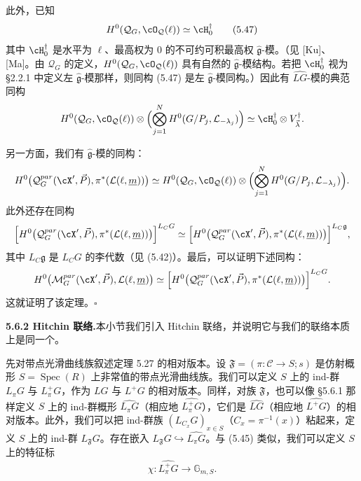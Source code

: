此外，已知
\begin{equation}
 H^0(\mathcal Q_G,\cO_{\mathcal Q}(\ell))\simeq\cH_0^\dagger \tag{5.47}
\end{equation}
其中 $\cH_0^\dagger$ 是水平为 $\ell$、最高权为 0 的不可约可积最高权 $\hat{\mathfrak g}$-模。（见 [Ku]、[Ma]。由 $\mathcal Q_G$ 的定义，$H^0(\mathcal Q_G,\cO_{\mathcal Q}(\ell))$ 具有自然的 $\hat{\mathfrak g}$-模结构。若把 $\cH_0^\dagger$ 视为 §2.2.1 中定义左 $\hat{\mathfrak g}$-模那样，则同构 (5.47) 是左 $\hat{\mathfrak g}$-模同构。）因此有 $\widehat{LG}$-模的典范同构
\[
 H^0(\mathcal Q_G,\cO_{\mathcal Q}(\ell))\otimes\Bigl(\bigotimes_{j=1}^N H^0(G/P_j,\mathcal L_{-\lambda_j})\Bigr)
 \simeq\cH_0^\dagger\otimes V_{\vec\lambda}^\dagger.
\]


另一方面，我们有 $\hat{\mathfrak g}$-模的同构：
\[
 H^0\bigl(\mathcal Q_G^{par}(\cX',\vec P),\pi^*(\mathcal L(\ell,\underline m))\bigr)
 \simeq H^0(\mathcal Q_G,\cO_{\mathcal Q}(\ell))\otimes\Bigl(\bigotimes_{j=1}^N H^0(G/P_j,\mathcal L_{-\lambda_j})\Bigr).
\]
此外还存在同构
\[
 \Bigl[H^0\bigl(\mathcal Q_G^{par}(\cX',\vec P),\pi^*(\mathcal L(\ell,\underline m))\bigr)\Bigr]^{L_CG}
 \simeq\Bigl[H^0\bigl(\mathcal Q_G^{par}(\cX',\vec P),\pi^*(\mathcal L(\ell,\underline m))\bigr)\Bigr]^{L_C\mathfrak g},
\]
其中 $L_C\mathfrak g$ 是 $L_CG$ 的李代数（见 (5.42)）。最后，可以证明下述同构：
\[
 H^0\bigl(\mathcal M_G^{par}(\cX',\vec P),\mathcal L(\ell,\underline m)\bigr)
 \simeq\Bigl[H^0\bigl(\mathcal Q_G^{par}(\cX',\vec P),\pi^*(\mathcal L(\ell,\underline m))\bigr)\Bigr]^{L_CG}.
\]
这就证明了该定理。\hfill$\square$


\noindent\textbf{5.6.2 Hitchin 联络.}\quad 本小节我们引入 Hitchin 联络，并说明它与我们的联络本质上是同一个。

先对带点光滑曲线族叙述定理 5.27 的相对版本。设 $\mathfrak F=(\pi\colon\mathcal C\to S;s)$ 是仿射概形 $S=\operatorname{Spec}(R)$ 上非常值的带点光滑曲线族。我们可以定义 $S$ 上的 ind-群 $L_\pi G$ 与 $L_\pi^+G$，作为 $LG$ 与 $L^+G$ 的相对版本。同样，对族 $\mathfrak F$，也可以像 §5.6.1 那样定义 $S$ 上的 ind-群概形 $\widehat{L_\pi G}$（相应地 $\widehat{L_\pi^+G}$），它们是 $\widehat{LG}$（相应地 $\widehat{L^+G}$）的相对版本。此外，我们可以把 ind-群族 $(L_{C_x}G)_{x\in S}$（$C_x=\pi^{-1}(x)$）粘起来，定义 $S$ 上的 ind-群 $L_{\mathfrak F}G$。存在嵌入 $L_{\mathfrak F}G\hookrightarrow\widehat{L_\pi G}$。与 (5.45) 类似，我们可以定义 $S$ 上的特征标
\begin{equation}
 \chi\colon\widehat{L_\pi^+G}\to\mathbb G_{m,S}. \tag{5.48}
\end{equation}


